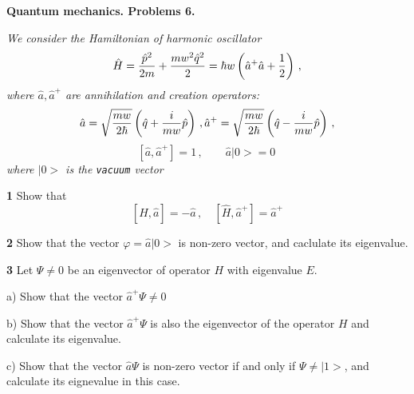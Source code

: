 \baselineskip=14pt
\def\vare {\varepsilon}
\def\A {{\bf A}}
\def\t {\tilde}
\def\a {\alpha}
\def\K {{\bf K}}
\def\N {{\bf N}}
\def\V {{\cal V}}
\def\s {{\sigma}}
\def\S {{\Sigma}}
\def\s {{\sigma}}
\def\p{\partial}
\def\vare{{\varepsilon}}
\def\Q {{\bf Q}}
\def\D {{\cal D}}
\def\G {{\Gamma}}
\def\C {{\bf C}}
\def\M {{\cal M}}
\def\Z {{\bf Z}}
\def\U  {{\cal U}}
\def\H {{\cal H}}
\def\R  {{\bf R}}
\def\S  {{\bf S}}
\def\E  {{\bf E}}
\def\l {\lambda}
\def\ll {{\bf l}}
\def\degree {{\bf {\rm degree}\,\,}}
\def \finish {${\,\,\vrule height1mm depth2mm width 8pt}$}
\def \m {\medskip}
\def\p {\partial}
\def\r {{\bf r}}
\def\pt {{\bf p}}
\def\v {{\bf v}}
\def\n {{\bf n}}
\def\t {{\bf t}}
\def\b {{\bf b}}
\def\c {{\bf c }}
\def\e{{\bf e}}
\def\ac {{\bf a}}
\def \X   {{\bf X}}
\def \Y   {{\bf Y}}
\def \x   {{\bf x}}
\def \y   {{\bf y}}
\def \z   {{\bf z}}
\def \G{{\cal G}}
\def\w {{\omega}}
\def \Tr  {{\rm Tr\,}}
\def\V {{\cal V}}


\centerline {\bf Quantum mechanics. Problems 6.}

\m


{\it We consider the Hamiltonian of harmonic oscillator
      $$
  \hat H={\hat p^2\over 2m}+{mw^2\hat q^2\over 2}=
    \hbar w\left(\hat a^+\hat a+{1\over 2}\right)\,,
      $$
where $\hat a,\hat a^+$ are annihilation and creation operators:
        $$
  \hat a=\sqrt{mw\over 2\hbar}\left(\hat q+{i\over mw}\hat p\right)\,,
  \hat a^+=\sqrt{mw\over 2\hbar}\left(\hat q-{i\over mw}\hat p\right)\,,
        $$        
 $$
     [\hat a,\hat a^+]=1\,,\qquad
        \hat a|0>=0\,
         $$
where $|0>$ is the {\tt vacuum} vector 
 

}

{\bf 1}  Show that
       $$
 [\hat H,\hat a]=-\hat a\,,\quad
 [\hat H,\hat a^+]=\hat a^+
       $$

\m

{\bf 2}  Show that the vector $\varphi=\hat a|0>$
is non-zero vector, and caclulate its eigenvalue.



\m

{\bf 3}
  Let $\Psi\not=0$  be an eigenvector of operator $H$
  with eigenvalue $E$.

    a) Show that the vector $\hat a^+\Psi\not=0$

    b) Show that the vector $\hat a^+\Psi$ is also the eigenvector
of the operator $H$ and calculate its eigenvalue.
   
    c) Show that the vector $\hat a\Psi$ is non-zero vector if
and only if $\Psi\not=|1>$,  and calculate its eignevalue in 
this case. 

